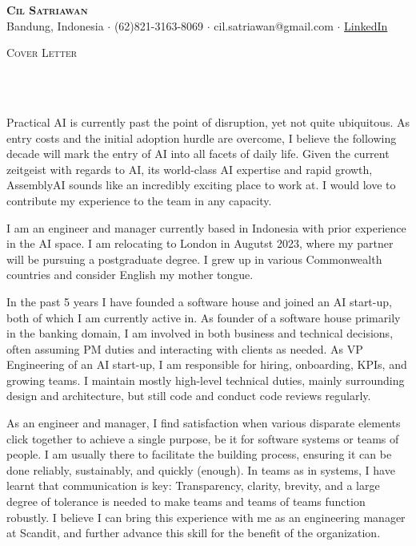 \documentclass[11pt]{article}
\newcommand{\lineunder} {
    \vspace*{-8pt} \\
    \hspace*{-10pt} \hrulefill \\
}
\newcommand{\header} [1] {
    \begin{center}
      {\large \scshape {#1}}
      \lineunder
    \end{center}
    \vspace*{-8pt}
}
\newcommand{\profile} [5] {
    \vspace*{-15pt}
    \begin{center}
        {\huge \scshape \textbf{#1}}\\
        \vspace{1mm}
        \small {#2} $\cdot$ {#3} $\cdot$ {#4} $\cdot$ {#5}
    \end{center}
    \vspace*{-8pt}
}
\begin{document}
\vspace*{-40pt}

\profile{Cil Satriawan}{Bandung, Indonesia}{(62)821-3163-8069}
{cil.satriawan@gmail.com}{\href{https://www.linkedin.com/in/cil-satriawan-a60601111}{LinkedIn}}

\header{Cover Letter}
\vspace{1mm}

Practical AI is currently past the point of disruption, yet not quite
ubiquitous. As entry costs and the initial adoption hurdle are overcome, I
believe the following decade will mark the entry of AI into all facets of daily
life. Given the current zeitgeist with regards to AI, its world-class AI
expertise and rapid growth, AssemblyAI sounds like an incredibly exciting place
to work at. I would love to contribute my experience to the team in any capacity.
\vspace{3mm}

I am an engineer and manager currently based in Indonesia with prior experience
in the AI space. I am relocating to London in Augutst 2023, where my partner
will be pursuing a postgraduate degree. I grew up in various Commonwealth
countries and consider English my mother tongue.
\vspace{3mm}

In the past 5 years I have founded a software house and joined an
AI start-up, both of which I am currently active in. As founder of a software
house primarily in the banking domain, I am involved in both business and
technical decisions, often assuming PM duties and interacting with clients as
needed. As VP Engineering of an AI start-up, I am responsible for hiring,
onboarding, KPIs, and growing teams. I maintain mostly high-level technical
duties, mainly surrounding design and architecture, but still code and conduct
code reviews regularly.
\vspace{3mm}

As an engineer and manager, I find satisfaction when various disparate elements
click together to achieve a single purpose, be it for software systems or teams
of people. I am usually there to facilitate the building process, ensuring it
can be done reliably, sustainably, and quickly (enough). In teams as in systems,
I have learnt that communication is key: Transparency, clarity, brevity, and a
large degree of tolerance is needed to make teams and teams of teams function
robustly. I believe I can bring this experience with me as an engineering
manager at Scandit, and further advance this skill for the benefit of
the organization.
\vspace{3mm}
\end{document}

